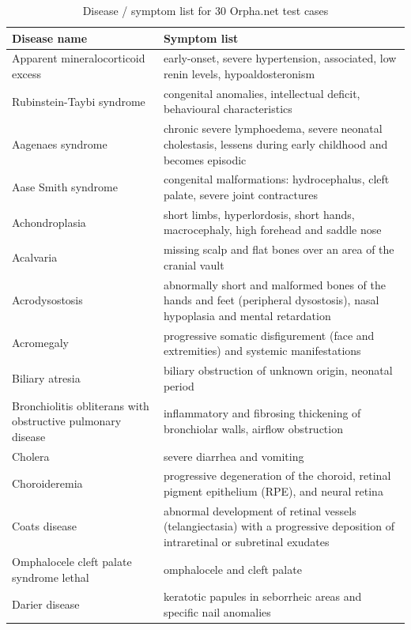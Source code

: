 \begin{table}[H]
\caption{Disease / symptom list for 30 Orpha.net test cases}
\label{OrphanetCases1}
\begin{scriptsize}
\begin{tabular}{| p{6cm} | p{6.5cm} |}
\hline
Disease name & Symptom list \\
\hline
Apparent mineralocorticoid excess & early-onset, severe hypertension, associated, low renin levels, hypoaldosteronism \\
\hline
Rubinstein-Taybi syndrome & congenital anomalies, intellectual deficit, behavioural characteristics \\
\hline
Aagenaes syndrome & chronic severe lymphoedema, severe neonatal cholestasis, lessens during early childhood and becomes episodic \\
\hline
Aase Smith syndrome & congenital malformations: hydrocephalus, cleft palate, severe joint contractures \\
\hline
Achondroplasia & short limbs, hyperlordosis, short hands, macrocephaly, high forehead and saddle nose \\
\hline
Acalvaria & missing scalp and flat bones over an area of the cranial vault \\
\hline
Acrodysostosis & abnormally short and malformed bones of the hands and feet (peripheral dysostosis), nasal hypoplasia and mental retardation \\
\hline
Acromegaly & progressive somatic disfigurement (face and extremities) and systemic manifestations \\
\hline
Biliary atresia & biliary obstruction of unknown origin, neonatal period \\
\hline
Bronchiolitis obliterans with obstructive pulmonary disease & inflammatory and fibrosing thickening of bronchiolar walls, airflow obstruction \\
\hline
Cholera & severe diarrhea and vomiting \\
\hline
Choroideremia & progressive degeneration of the choroid, retinal pigment epithelium (RPE), and neural retina \\
\hline
Coats disease & abnormal development of retinal vessels (telangiectasia) with a progressive deposition of intraretinal or subretinal exudates \\
\hline
Omphalocele cleft palate syndrome lethal & omphalocele and cleft palate \\
\hline
Darier disease & keratotic papules in seborrheic areas and specific nail anomalies \\

\end{tabular}
\end{scriptsize}
\end{table}
